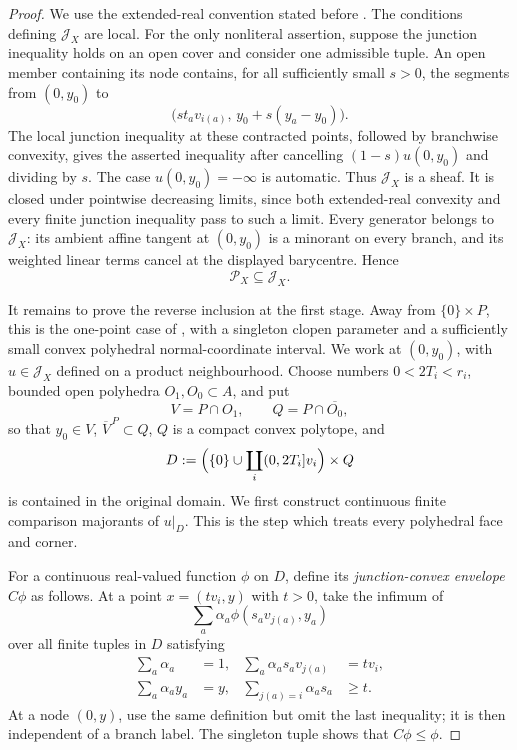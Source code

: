 \begin{proof}
We use the extended-real convention stated before
.  The conditions defining
\(\mathcal J_X\) are local.  For the only nonliteral assertion, suppose the
junction inequality holds on an open cover and consider one admissible
tuple.  An open member containing its node contains, for all sufficiently
small \(s>0\), the segments from \((0,y_0)\) to
\[
 \bigl(st_av_{i(a)},\,y_0+s(y_a-y_0)\bigr).
\]
The local junction inequality at these contracted points, followed by
branchwise convexity, gives the asserted inequality after cancelling
\((1-s)u(0,y_0)\) and dividing by \(s\).  The case
\(u(0,y_0)=-\infty\) is automatic.  Thus \(\mathcal J_X\) is a sheaf.
It is closed under pointwise decreasing limits, since both extended-real
convexity and every finite junction inequality pass to such a limit.
Every generator belongs to \(\mathcal J_X\): its ambient affine tangent at
\((0,y_0)\) is a minorant on every branch, and its weighted linear terms
cancel at the displayed barycentre.  Hence
\[
                         \mathcal P_X\subseteq\mathcal J_X.
 \tag{\(\dagger\)}
\]

It remains to prove the reverse inclusion at the first stage.  Away from
\(\{0\}\times P\), this is the one-point case of
, with a singleton clopen
parameter and a sufficiently small convex polyhedral normal-coordinate
interval.  We work at \((0,y_0)\), with \(u\in\mathcal J_X\) defined on
a product neighbourhood.  Choose numbers \(0<2T_i<r_i\), bounded open
polyhedra \(O_1,O_0\subset A\), and put
\[
 V=P\cap O_1,\qquad Q=P\cap\overline{O_0},
\]
so that \(y_0\in V\), \(\overline V^{\,P}\subset Q\), \(Q\) is a
compact convex polytope, and
\[
 D:=\Bigl(\{0\}\cup\coprod_i(0,2T_i]v_i\Bigr)\times Q
\]
is contained in the original domain.  We first construct continuous finite
comparison majorants of \(u|_D\).  This is the step which treats every
polyhedral face and corner.

For a continuous real-valued function \(\phi\) on \(D\), define its
\emph{junction-convex envelope} \(C\phi\) as follows.  At a point
\(x=(tv_i,y)\) with \(t>0\), take the infimum of
\[
                   \sum_a\alpha_a\phi(s_av_{j(a)},y_a)
 \tag{\(\clubsuit\)}
\]
over all finite tuples in \(D\) satisfying
\[
 \begin{aligned}
 \sum_a\alpha_a&=1,
 &\sum_a\alpha_as_av_{j(a)}&=tv_i,\\
 \sum_a\alpha_ay_a&=y,
 &\sum_{j(a)=i}\alpha_as_a&\geq t.
 \end{aligned}
 \tag{\(\clubsuit_1\)}
\]
At a node \((0,y)\), use the same definition but omit the last inequality;
it is then independent of a branch label.  The singleton tuple shows that
\(C\phi\leq\phi\).


\end{proof}
